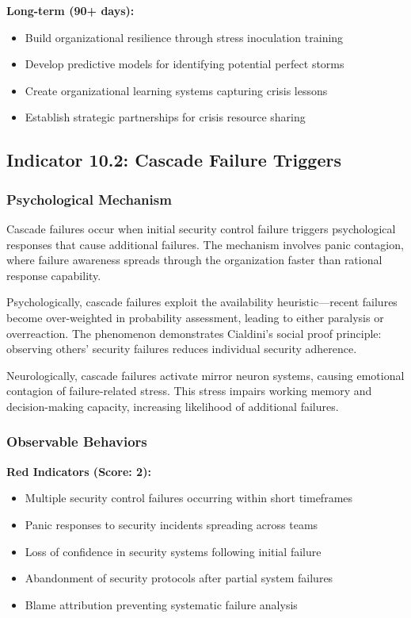 \documentclass[11pt,a4paper]{article}
\begin{document}
\textbf{Long-term (90+ days):}
\begin{itemize}
\item Build organizational resilience through stress inoculation training
\item Develop predictive models for identifying potential perfect storms
\item Create organizational learning systems capturing crisis lessons
\item Establish strategic partnerships for crisis resource sharing
\end{itemize}

\subsection{Indicator 10.2: Cascade Failure Triggers}

\subsubsection{Psychological Mechanism}

Cascade failures occur when initial security control failure triggers psychological responses that cause additional failures. The mechanism involves panic contagion, where failure awareness spreads through the organization faster than rational response capability.

Psychologically, cascade failures exploit the availability heuristic—recent failures become over-weighted in probability assessment, leading to either paralysis or overreaction. The phenomenon demonstrates Cialdini's\cite{cialdini2007} social proof principle: observing others' security failures reduces individual security adherence.

Neurologically, cascade failures activate mirror neuron systems, causing emotional contagion of failure-related stress. This stress impairs working memory and decision-making capacity, increasing likelihood of additional failures.

\subsubsection{Observable Behaviors}

\textbf{Red Indicators (Score: 2):}
\begin{itemize}
\item Multiple security control failures occurring within short timeframes
\item Panic responses to security incidents spreading across teams
\item Loss of confidence in security systems following initial failure
\item Abandonment of security protocols after partial system failures
\item Blame attribution preventing systematic failure analysis
\end{itemize}
\end{document}
